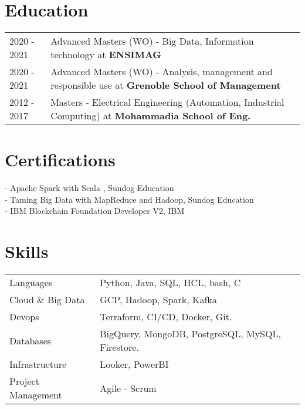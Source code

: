 \documentclass[a4paper,10pt]{article}
\begin{document}
\section{Education}
\begin{tabularx}{\linewidth}{@{}l X@{}}	
2020 - 2021 & Advanced Masters (WO) - Big Data, Information technology at \textbf{ENSIMAG} \hfill \normalsize  \\

2020 - 2021 & Advanced Masters (WO) - Analysis, management and responsible use 
 at \textbf{Grenoble School of Management} \hfill  \\ 

2012 - 2017 & Masters - Electrical Engineering (Automation, Industrial Computing) at \textbf{Mohammadia School of Eng.} \hfill \normalsize \\

\end{tabularx}

\section{Certifications}
\begin{refsection}
\nocite{*} - Apache Spark with Scala , Sundog Education\\
\nocite{*} - Taming Big Data with MapReduce and Hadoop, Sundog Education \\
\nocite{*} - IBM Blockchain Foundation Developer V2, IBM 
\end{refsection}

\section{Skills}
\begin{tabularx}{\linewidth}{@{}l X@{}}
Languages &  \normalsize{Python, Java, SQL, HCL, bash, C}\\
Cloud \& Big Data  &  \normalsize{GCP, Hadoop, Spark, Kafka}\\  
Devops  &  \normalsize{Terraform, CI/CD, Docker, Git.}\\  
Databases  &  \normalsize{BigQuery, MongoDB, PostgreSQL, MySQL, Firestore.}\\   
Infrastructure  &  \normalsize{Looker, PowerBI}\\  
Project Management  &  \normalsize{Agile - Scrum}\\ 
\end{tabularx}

\vfill
\end{document}

